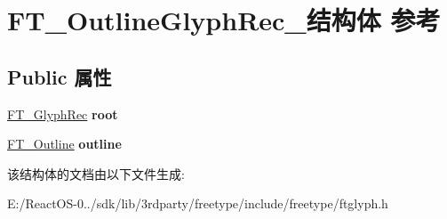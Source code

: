 \hypertarget{struct_f_t___outline_glyph_rec__}{}\section{F\+T\+\_\+\+Outline\+Glyph\+Rec\+\_\+结构体 参考}
\label{struct_f_t___outline_glyph_rec__}
\subsection*{Public 属性}
\begin{DoxyCompactItemize}
\item 
\mbox{\label{struct_f_t___outline_glyph_rec___a71e5a8d5fe69e0cea68c96486dd6713f}} 
\hyperlink{struct_f_t___glyph_rec__}{F\+T\+\_\+\+Glyph\+Rec} {\bfseries root}
\item 
\mbox{\label{struct_f_t___outline_glyph_rec___af1bd473a32fcbc500edcfcf89e3ac8ac}} 
\hyperlink{struct_f_t___outline__}{F\+T\+\_\+\+Outline} {\bfseries outline}
\end{DoxyCompactItemize}


该结构体的文档由以下文件生成\+:\begin{DoxyCompactItemize}
\item 
E\+:/\+React\+O\+S-\/0../sdk/lib/3rdparty/freetype/include/freetype/ftglyph.\+h\end{DoxyCompactItemize}
